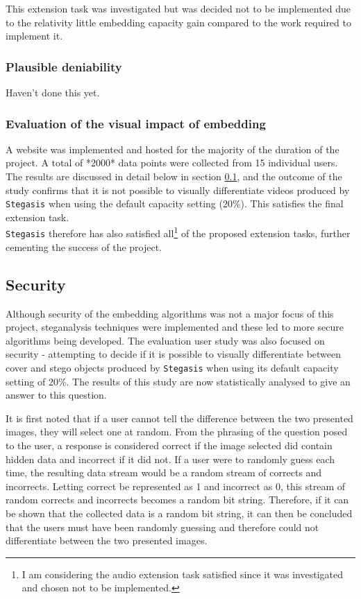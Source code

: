 \documentclass[paper=a4, fontsize=11pt,twoside]{scrartcl}
\numberwithin{table}{section}
\numberwithin{figure}{section}
\numberwithin{algorithm}{section}
\begin{document}
This extension task was investigated but was decided not to be implemented due to the relativity little embedding capacity gain compared to the work required to implement it.

\subsubsection{Plausible deniability}

Haven't done this yet.

\subsubsection{Evaluation of the visual impact of embedding}

A website was implemented and hosted for the majority of the duration of the project. A total of *2000* data points were collected from 15 individual users. The results are discussed in detail below in section \ref{security}, and the outcome of the study confirms that it is not possible to visually differentiate videos produced by \texttt{Stegasis} when using the default capacity setting (20\%). This satisfies the final extension task.\\

\noindent
\texttt{Stegasis} therefore has also satisfied all\footnote{I am considering the audio extension task satisfied since it was investigated and chosen not to be implemented.} of the proposed extension tasks, further cementing the success of the project.

\subsection{Security}
\label{security}

Although security of the embedding algorithms was not a major focus of this project, steganalysis techniques were implemented and these led to more secure algorithms being developed. The evaluation user study was also focused on security - attempting to decide if it is possible to visually differentiate between cover and stego objects produced by \texttt{Stegasis} when using its default capacity setting of 20\%. The results of this study are now statistically analysed to give an answer to this question.

It is first noted that if a user cannot tell the difference between the two presented images, they will select one at random. From the phrasing of the question posed to the user, a response is considered correct if the image selected did contain hidden data and incorrect if it did not. If a user were to randomly guess each time, the resulting data stream would be a random stream of corrects and incorrects. Letting correct be represented as 1 and incorrect as 0, this stream of random corrects and incorrects becomes a random bit string. Therefore, if it can be shown that the collected data is a random bit string, it can then be concluded that the users must have been randomly guessing and therefore could not differentiate between the two presented images.
\end{document}
